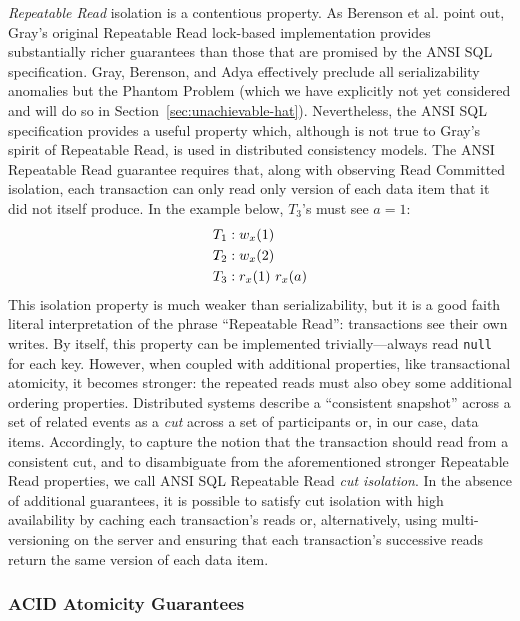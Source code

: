 \textit{Repeatable Read} isolation is a contentious property. As
Berenson et al. point out, Gray's original Repeatable Read lock-based
implementation provides substantially richer guarantees than those
that are promised by the ANSI SQL specification. Gray, Berenson, and
Adya effectively preclude all serializability anomalies but the
Phantom Problem (which we have explicitly not yet considered and will
do so in Section~\ref{sec:unachievable-hat}). Nevertheless, the ANSI
SQL specification provides a useful property which, although is not
true to Gray's spirit of Repeatable Read, is used in distributed
consistency models. The ANSI Repeatable Read guarantee requires that,
along with observing Read Committed isolation, each transaction can
only read only version of each data item that it did not itself
produce. In the example below, $T_3$'s must see $a=1$:
\begin{align*}
\small
T_1 &: w_x(1)
\\T_2 &: w_x(2)
\\T_3 &: r_x(1)~r_x(a)
\end{align*}
This isolation property is much weaker than serializability, but it is
a good faith literal interpretation of the phrase ``Repeatable Read'':
transactions see their own writes. By itself, this property can be
implemented trivially---always read \texttt{null} for each
key. However, when coupled with additional properties, like
transactional atomicity, it becomes stronger: the repeated reads must
also obey some additional ordering properties. Distributed systems
describe a ``consistent snapshot'' across a set of related events as a
\textit{cut} across a set of participants or, in our case, data
items. Accordingly, to capture the notion that the transaction should
read from a consistent cut, and to disambiguate from the
aforementioned stronger Repeatable Read properties, we call ANSI SQL
Repeatable Read \textit{cut isolation}. In the absence of additional
guarantees, it is possible to satisfy cut isolation with high
availability by caching each transaction's reads or, alternatively,
using multi-versioning on the server and ensuring that each
transaction's successive reads return the same version of each data
item.

\subsubsection{ACID Atomicity Guarantees}

